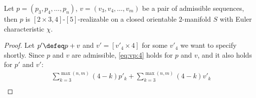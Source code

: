 \begin{proposition}
  Let $p = (p_3, p_4, \dots, p_n)$, $v = (v_3, v_4, \dots, v_m)$ be a pair of admissible sequences, then $p$ is $[2\times3, 4]$-$[5]$-realizable on a closed orientable $2$-manifold $S$ with {\sc Euler} characteristic $\chi$.
  \begin{proof}
    Let $p' \defeq p + v$ and $v' = [v'_4 \times 4]$ for some $v'_4$ we want to specify shortly. Since $p$ and $v$ are admissible, \autoref{eq:vp:4} holds for $p$ and $v$, and it also holds for $p'$ and $v'$:
    \begin{align*}
      &\sum_{k=3}^{\max(n, m)} (4 - k) p'_k + \sum_{k=3}^{\max(n, m)} (4 - k) v'_k \\

\end{align*}
\end{proof}
\end{proposition}
